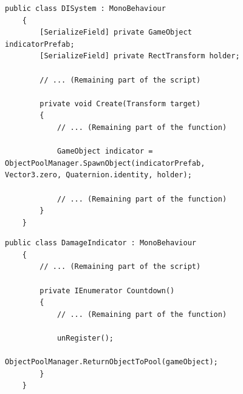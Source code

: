 \begin{figure}[h]
    \begin{codebox}
    \begin{lstlisting}[language={[Sharp]C}, label={listing:DISystem.cs}]
    public class DISystem : MonoBehaviour
    {
        [SerializeField] private GameObject indicatorPrefab;
        [SerializeField] private RectTransform holder;

        // ... (Remaining part of the script)
        
        private void Create(Transform target)
        {
            // ... (Remaining part of the function)

            GameObject indicator = ObjectPoolManager.SpawnObject(indicatorPrefab, Vector3.zero, Quaternion.identity, holder);
            
            // ... (Remaining part of the function)
        }
    }
    \end{lstlisting}
    \end{codebox}
\end{figure}
\begin{figure}[h]
    \begin{codebox}
    \begin{lstlisting}[language={[Sharp]C}, label={listing:DamageIndicator.cs}]
    public class DamageIndicator : MonoBehaviour
    {
        // ... (Remaining part of the script)
        
        private IEnumerator Countdown()
        {
            // ... (Remaining part of the function)

            unRegister();
            ObjectPoolManager.ReturnObjectToPool(gameObject);
        }
    }
    \end{lstlisting}
    \end{codebox}
\end{figure}